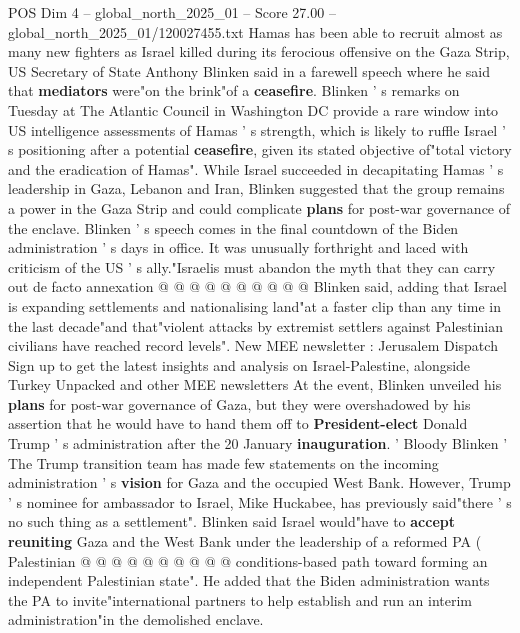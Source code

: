 \begin{textsample}{POS Dim 4 – global\_north\_2025\_01 – Score 27.00 – global\_north\_2025\_01/120027455.txt}  \label{ex:f4_pos_048}
Hamas has been able to recruit almost as many new fighters as Israel killed during its ferocious offensive on the Gaza Strip, US Secretary of State Anthony Blinken said in a farewell speech where he said that \textbf{mediators} were"on the brink"of a \textbf{ceasefire}.
Blinken ' s remarks on Tuesday at The Atlantic Council in Washington DC provide a rare window into US intelligence assessments of Hamas ' s strength, which is likely to ruffle Israel ' s positioning after a potential \textbf{ceasefire}, given its stated objective of"total victory and the eradication of Hamas".
While Israel succeeded in decapitating Hamas ' s leadership in Gaza, Lebanon and Iran, Blinken suggested that the group remains a power in the Gaza Strip and could complicate \textbf{plans} for post-war governance of the enclave.
Blinken ' s speech comes in the final countdown of the Biden administration ' s days in office.
It was unusually forthright and laced with criticism of the US ' s ally."Israelis must abandon the myth that they can carry out de facto annexation @ @ @ @ @ @ @ @ @ @ Blinken said, adding that Israel is expanding settlements and nationalising land"at a faster clip than any time in the last decade"and that"violent attacks by extremist settlers against Palestinian civilians have reached record levels".
New MEE newsletter : Jerusalem Dispatch Sign up to get the latest insights and analysis on Israel-Palestine, alongside Turkey Unpacked and other MEE newsletters At the event, Blinken unveiled his \textbf{plans} for post-war governance of Gaza, but they were overshadowed by his assertion that he would have to hand them off to \textbf{President-elect} Donald Trump ' s administration after the 20 January \textbf{inauguration}. ' Bloody Blinken ' The Trump transition team has made few statements on the incoming administration ' s \textbf{vision} for Gaza and the occupied West Bank.
However, Trump ' s nominee for ambassador to Israel, Mike Huckabee, has previously said"there ' s no such thing as a settlement".
Blinken said Israel would"have to \textbf{accept} \textbf{reuniting} Gaza and the West Bank under the leadership of a reformed PA ( Palestinian @ @ @ @ @ @ @ @ @ @ conditions-based path toward forming an independent Palestinian state".
He added that the Biden administration wants the PA to invite"international partners to help establish and run an interim administration"in the demolished enclave.

\end{textsample}
